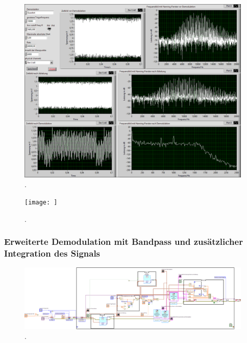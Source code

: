 \documentclass[
a4paper,
12pt,
pagesize,
ngerman
]{scrartcl}
\begin{document}
	\begin{figure}[h]
		\centering
		\includegraphics[width=1.0\textwidth]{EIRE2018Dateien/Tag4/OsziFMPM-Demod/PM/OsziPlusFMPMp}
		\caption{.}
	\end{figure}

	\begin{figure}[h] %
		\centering
		\texttt{[image: ]}
		\caption{.}
	\end{figure}
	
	\subsubsection{Erweiterte Demodulation mit Bandpass und zusätzlicher Integration des Signals}
	
	\begin{figure}[h]
		\centering
		\includegraphics[width=1.0\textwidth]{EIRE2018Dateien/Tag4/OsziFMPM-Demod/mitBandpassUndIntegrationBilder/OsziPlusFMPMd}
		\caption{.}
	\end{figure}
\end{document}
